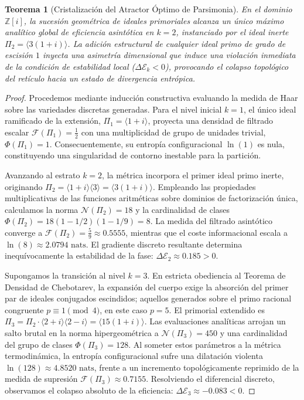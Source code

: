 \documentclass{article}
\numberwithin{equation}{section}
\theoremstyle{plain}
\newtheorem{teorema}{Teorema}[section]
\theoremstyle{definition}
\begin{document}
\begin{teorema}[Cristalización del Atractor Óptimo de Parsimonia]
\label{teo:chandrasekhar_lattice_formal}
En el dominio $\mathbb{Z}[i]$, la sucesión geométrica de ideales primoriales alcanza un único máximo analítico global de eficiencia asintótica en $k=2$, instanciado por el ideal inerte $\Pi_2 = \langle 3(1+i) \rangle$. La adición estructural de cualquier ideal primo de grado de escisión $1$ inyecta una asimetría dimensional que induce una violación inmediata de la condición de estabilidad local ($\Delta \mathcal{E}_k < 0$), provocando el colapso topológico del retículo hacia un estado de divergencia entrópica.
\end{teorema}

\begin{proof}
Procedemos mediante inducción constructiva evaluando la medida de Haar sobre las variedades discretas generadas. 
Para el nivel inicial $k=1$, el único ideal ramificado de la extensión, $\Pi_1 = \langle 1+i \rangle$, proyecta una densidad de filtrado escalar $\mathcal{F}(\Pi_1) = \frac{1}{2}$ con una multiplicidad de grupo de unidades trivial, $\Phi(\Pi_1) = 1$. Consecuentemente, su entropía configuracional $\ln(1)$ es nula, constituyendo una singularidad de contorno inestable para la partición.

Avanzando al estrato $k=2$, la métrica incorpora el primer ideal primo inerte, originando $\Pi_2 = \langle 1+i \rangle \langle 3 \rangle = \langle 3(1+i) \rangle$. Empleando las propiedades multiplicativas de las funciones aritméticas sobre dominios de factorización única, calculamos la norma $\mathcal{N}(\Pi_2) = 18$ y la cardinalidad de clases $\Phi(\Pi_2) = 18(1 - 1/2)(1 - 1/9) = 8$. 
La medida del filtrado asintótico converge a $\mathcal{F}(\Pi_2) = \frac{5}{9} \approx 0.5555$, mientras que el coste informacional escala a $\ln(8) \approx 2.0794 \text{ nats}$. El gradiente discreto resultante determina inequívocamente la estabilidad de la fase: $\Delta \mathcal{E}_2 \approx 0.185 > 0$.

Supongamos la transición al nivel $k=3$. En estricta obediencia al Teorema de Densidad de Chebotarev, la expansión del cuerpo exige la absorción del primer par de ideales conjugados escindidos; aquellos generados sobre el primo racional congruente $p \equiv 1 \pmod 4$, en este caso $p=5$. El primorial extendido es $\Pi_3 = \Pi_2 \cdot \langle 2+i \rangle \langle 2-i \rangle = \langle 15(1+i) \rangle$. Las evaluaciones analíticas arrojan un salto brutal en la norma hipergeométrica a $\mathcal{N}(\Pi_3) = 450$ y una cardinalidad del grupo de clases $\Phi(\Pi_3) = 128$.
Al someter estos parámetros a la métrica termodinámica, la entropía configuracional sufre una dilatación violenta $\ln(128) \approx 4.8520 \text{ nats}$, frente a un incremento topológicamente reprimido de la medida de supresión $\mathcal{F}(\Pi_3) \approx 0.7155$.
Resolviendo el diferencial discreto, observamos el colapso absoluto de la eficiencia: $\Delta \mathcal{E}_3 \approx -0.083 < 0$. 


\end{proof}
\end{document}
